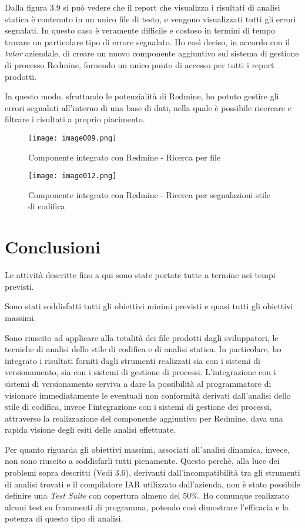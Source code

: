 Dalla figura 3.9 si può vedere che il report che visualizza i risultati di analisi statica è contenuto in un unico file di testo, e vengono visualizzati tutti gli errori segnalati. In questo caso è veramente difficile e costoso in termini di tempo trovare un particolare tipo di errore segnalato. Ho così deciso, in accordo con il \textit{tutor} aziendale, di creare un nuovo componente aggiuntivo sul sistema di gestione di processo Redmine, fornendo un unico punto di accesso per tutti i report prodotti.

In questo modo, sfruttando le potenzialità di Redmine, ho potuto gestire gli errori segnalati all'interno di una base di dati, nella quale è possibile ricercare e filtrare i risultati a proprio piacimento.

\begin{figure}[H]
  \centering
  \texttt{[image: image009.png]}
  \caption{Componente integrato con Redmine - Ricerca per file}
\end{figure}

\begin{figure}[H]
  \centering
  \texttt{[image: image012.png]}
  \caption{Componente integrato con Redmine - Ricerca per segnalazioni stile di codifica}
\end{figure}

\section{Conclusioni}
Le attività descritte fino a qui sono state portate tutte a termine nei tempi previsti.

Sono stati soddisfatti tutti gli obiettivi minimi previsti e quasi tutti gli obiettivi massimi.

Sono riuscito ad applicare alla totalità dei file prodotti dagli sviluppatori, le tecniche di analisi dello stile di codifica e di analisi statica. In particolare, ho integrato i risultati forniti dagli strumenti realizzati sia con i sistemi di versionamento, sia con i sistemi di gestione di processi. L'integrazione con i sistemi di versionamento serviva a dare la possibilità
al programmatore di visionare immediatamente le eventuali non conformità derivati dall'analisi dello stile di codifica, invece l'integrazione con i sistemi di gestione dei processi, attraverso la realizzazione del componente aggiuntivo per Redmine, dava una rapida visione degli esiti delle analisi effettuate.

Per quanto riguarda gli obiettivi massimi, associati all'analisi dinamica, invece, non sono riuscito a soddisfarli tutti pienamente. Questo perchè, alla luce dei problemi sopra descritti (Vedi 3.6), derivanti dall'incompatibilità tra gli strumenti di analisi trovati e il compilatore IAR utilizzato dall'azienda, non è stato possibile definire una \textit{Test Suite} con copertura almeno del 50\%. Ho comunque realizzato alcuni test su frammenti di programma, potendo così dimostrare l'efficacia e la potenza di questo tipo di analisi.



